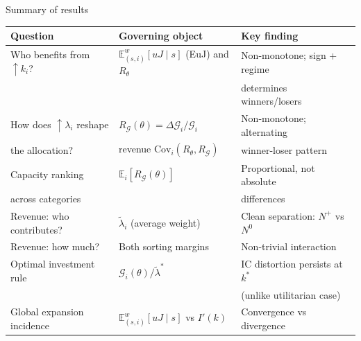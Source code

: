 \documentclass[10pt, aspectratio=169]{beamer}
\newcommand{\E}{\mathbb{E}}
\newcommand{\G}{\mathcal{G}}
\newcommand{\Cov}{\mathrm{Cov}}
\begin{document}
\begin{frame}{Summary of results}
\begin{table}
\small
\begin{tabular}{lll}
\toprule
\textbf{Question} & \textbf{Governing object} & \textbf{Key finding} \\
\midrule
Who benefits from $\uparrow k_i$? & $\E_{(s,i)}^w[uJ \mid s]$ (EuJ) and $R_\theta$ & Non-monotone; sign + regime \\
& & determines winners/losers \\
\midrule
How does $\uparrow \lambda_i$ reshape & $R_\G(\theta) = \Delta\G_i/\G_i$ & Non-monotone; alternating \\
the allocation? & revenue $\Cov_i(R_\theta, R_\G)$ & winner-loser pattern \\
\midrule
Capacity ranking & $\E_i[R_\G(\theta)]$ & Proportional, not absolute \\
across categories & & differences \\
\midrule
Revenue: who contributes? & $\tilde\lambda_i$ (average weight) & Clean separation: $N^+$ vs $N^0$ \\
Revenue: how much? & Both sorting margins & Non-trivial interaction \\
\midrule
Optimal investment rule & $\G_i(\theta)/\tilde\lambda^\ast$ & IC distortion persists at $k^\ast$ \\
& & (unlike utilitarian case) \\
\midrule
Global expansion incidence & $\E_{(s,i)}^w[uJ \mid s]$ vs $I'(k)$ & Convergence vs divergence \\
\bottomrule
\end{tabular}
\end{table}
\end{frame}
\end{document}
